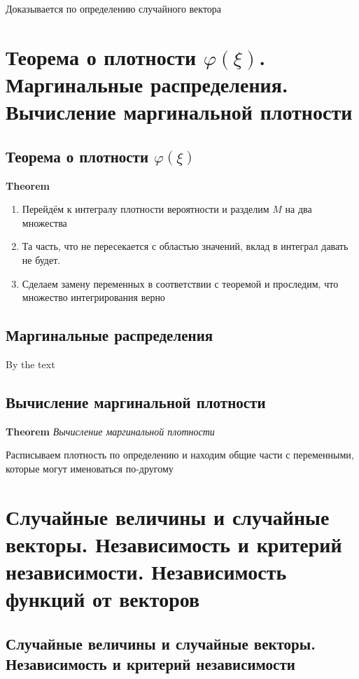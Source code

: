\documentclass[a4paper, 14pt]{article}
\begin{document}
    Доказывается по определению случайного вектора
    
    \section{Теорема о плотности $\varphi(\xi)$.
    Маргинальные распределения.
    Вычисление маргинальной плотности}
    
    \subsection{Теорема о плотности $\varphi(\xi)$}
    
    \textbf{Theorem}
    
    \begin{enumerate}
        \item Перейдём к интегралу плотности вероятности и разделим $M$ на два множества
        \item Та часть, что не пересекается с областью значений, вклад в интеграл давать не будет.
        \item Сделаем замену переменных в соответствии с теоремой и проследим, что множество интегрирования верно
    \end{enumerate}
    
    \subsection{Маргинальные распределения}
    
    By the text
    
    \subsection{Вычисление маргинальной плотности}
    
    \textbf{Theorem} \textit{Вычисление маргинальной плотности}
    
    Расписываем плотность по определению и находим общие части с переменными, которые могут именоваться по-другому
    
    \section{Случайные величины и случайные векторы.
    Независимость и критерий независимости.
    Независимость функций от векторов}
    
    \subsection{Случайные величины и случайные векторы. Независимость и критерий независимости}
    
\end{document}
